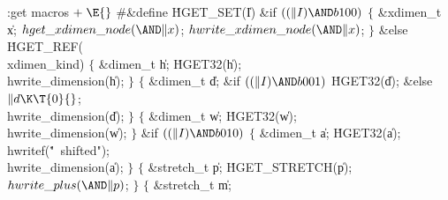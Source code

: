 \Y\B\4:get macros\X${}\mathrel+\E{}$\6
\8\#\&{define} \.{HGET\_SET}(\|I)\6
\&{if} ${}((\|I)\AND\\{b100}){}$\5
\1${}\{{}$\5
\&{xdimen\_t} \|x;\7
${}\index{hget xdimen node+\\{hget\_xdimen\_node}}\\{hget\_xdimen\_node}({\AND}\|x){}$;\5
${}\index{hwrite xdimen node+\\{hwrite\_xdimen\_node}}\\{hwrite\_xdimen\_node}({\AND}\|x){}$;\5
${}\}{}$\2\6
\&{else}\1\5
\.{HGET\_REF}(\\{xdimen\_kind})\2\1\6
\4${}\{{}$\5
\&{dimen\_t} \|h;\5
\.{HGET32}(\|h);\5
\\{hwrite\_dimension}(\|h);\5
${}\}{}$\2\1\6
\4${}\{{}$\5
\&{dimen\_t} \|d;\5
\&{if} ${}((\|I)\AND\\{b001}){}$\1\5
\.{HGET32}(\|d);\5
\2\&{else}\1\5
${}\|d\K\T{0}{}$;\5
\2\\{hwrite\_dimension}(\|d);\5
${}\}{}$\2\1\6
\4${}\{{}$\5
\&{dimen\_t} \|w;\5
\.{HGET32}(\|w);\5
\\{hwrite\_dimension}(\|w);\5
${}\}{}$\2\6
\&{if} ${}((\|I)\AND\\{b010}){}$\5
\1${}\{{}$\5
\&{dimen\_t} \|a;\5
\.{HGET32}(\|a);\6
\\{hwritef}(\.{"\ shifted"});\5
\\{hwrite\_dimension}(\|a);\5
${}\}{}$\2\1\6
\4${}\{{}$\5
\&{stretch\_t} \|p;\5
\.{HGET\_STRETCH}(\|p);\5
${}\index{hwrite plus+\\{hwrite\_plus}}\\{hwrite\_plus}({\AND}\|p){}$;\5
${}\}{}$\2\1\6
\4${}\{{}$\5
\&{stretch\_t} \|m;\5

